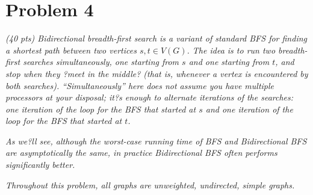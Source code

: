 \documentclass[12pt]{article} \setlength{\oddsidemargin}{0in}
\begin{document}
\newpage
\section*{Problem 4}

\textit{(40 pts) Bidirectional breadth-first search is a variant of standard BFS for finding a
shortest path between two vertices $s, t \in V(G)$. The idea is to run two breadth-first
searches simultaneously, one starting from $s$ and one starting from $t$, and stop when
they ?meet in the middle? (that is, whenever a vertex is encountered by both searches).
``Simultaneously'' here does not assume you have multiple processors at your disposal;
it?s enough to alternate iterations of the searches: one iteration of the loop for the BFS
that started at $s$ and one iteration of the loop for the BFS that started at $t$.}

\textit{As we?ll see, although the worst-case running time of BFS and Bidirectional BFS are
asymptotically the same, in practice Bidirectional BFS often performs significantly
better.}

\textit{Throughout this problem, all graphs are unweighted, undirected, simple graphs.}
\\\\
\end{document}
